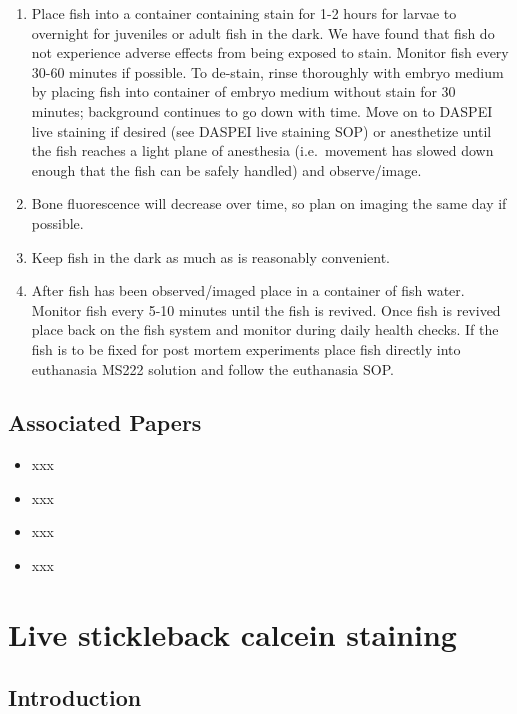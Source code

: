 \documentclass[
  letterpaper,
  DIV=11,
  numbers=noendperiod]{scrreprt}
\providecommand{\tightlist}{%
  \setlength{\itemsep}{0pt}\setlength{\parskip}{0pt}}\usepackage{longtable,booktabs,array}
\begin{document}
\begin{enumerate}
\def\labelenumi{\arabic{enumi}.}
\tightlist
\item
  Place fish into a container containing stain for 1-2 hours for larvae
  to overnight for juveniles or adult fish in the dark. We have found
  that fish do not experience adverse effects from being exposed to
  stain. Monitor fish every 30-60 minutes if possible. To de-stain,
  rinse thoroughly with embryo medium by placing fish into container of
  embryo medium without stain for 30 minutes; background continues to go
  down with time. Move on to DASPEI live staining if desired (see DASPEI
  live staining SOP) or anesthetize until the fish reaches a light plane
  of anesthesia (i.e.~movement has slowed down enough that the fish can
  be safely handled) and observe/image.
\item
  Bone fluorescence will decrease over time, so plan on imaging the same
  day if possible.
\item
  Keep fish in the dark as much as is reasonably convenient.
\item
  After fish has been observed/imaged place in a container of fish
  water. Monitor fish every 5-10 minutes until the fish is revived. Once
  fish is revived place back on the fish system and monitor during daily
  health checks. If the fish is to be fixed for post mortem experiments
  place fish directly into euthanasia MS222 solution and follow the
  euthanasia SOP.
\end{enumerate}

\hypertarget{associated-papers-49}{%
\section{Associated Papers}\label{associated-papers-49}}

\begin{itemize}
\tightlist
\item
  xxx
\item
  xxx
\item
  xxx
\item
  xxx
\end{itemize}

\hypertarget{sec-vert_exp-live_calcein_SB}{%
\chapter{Live stickleback calcein
staining}\label{sec-vert_exp-live_calcein_SB}}

\hypertarget{introduction-78}{%
\section{Introduction}\label{introduction-78}}
\end{document}

